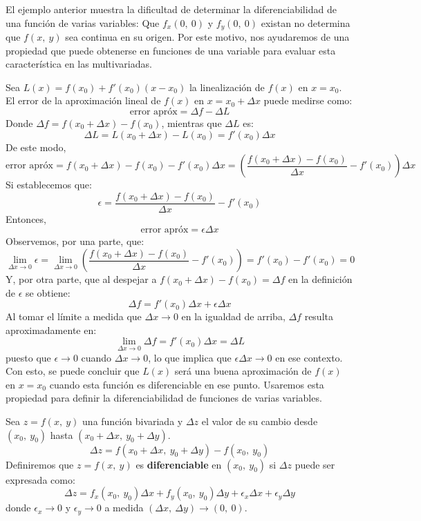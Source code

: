\documentclass[12pt]{article}
\begin{document}
El ejemplo anterior muestra la dificultad de determinar la diferenciabilidad de una función de varias variables: Que $f_{x}(0, \ 0)$ y $f_{y}(0, \ 0)$ existan no determina que $f(x, \ y)$ sea continua en su origen. Por este motivo, nos ayudaremos de una propiedad que puede obtenerse en funciones de una variable para evaluar esta característica en las multivariadas.

Sea $L(x) = f(x_{0}) + f'(x_{0})(x - x_{0})$ la linealización de $f(x)$ en $x = x_{0}$. El error de la aproximación lineal de $f(x)$ en $x = x_{0} + \Delta x$ puede medirse como:
\[
  \text{error apróx} = \Delta f - \Delta L
\]
Donde $\Delta f = f(x_{0} + \Delta x) - f(x_{0})$, mientras que $\Delta L$ es:
\[
  \Delta L = L(x_{0} + \Delta x) - L(x_{0})
           = f'(x_{0}) \Delta x
\]
De este modo,
\[
  \text{error apróx} = f(x_{0} + \Delta x) - f(x_{0}) - f'(x_{0}) \Delta x
                     = \left(\frac{f(x_{0} + \Delta x) - f(x_{0})}{\Delta x} - f'(x_{0})\right) \Delta x
\]
Si establecemos que:
\[
  \epsilon = \frac{f(x_{0} + \Delta x) - f(x_{0})}{\Delta x} - f'(x_{0})
\]
Entonces,
\[
  \text{error apróx} = \epsilon \Delta x
\]
Observemos, por una parte, que:
\[
  \lim_{\Delta x \to 0} \epsilon = \lim_{\Delta x \to 0} \left(\frac{f(x_{0} + \Delta x) - f(x_{0})}{\Delta x} - f'(x_{0})\right)
                                 = f'(x_{0}) - f'(x_{0})
                                 = 0
\]
Y, por otra parte, que al despejar a $f(x_{0} + \Delta x) - f(x_{0}) = \Delta f$ en la definición de $\epsilon$ se obtiene:
\[
  \Delta f = f'(x_{0}) \Delta x + \epsilon \Delta x
\]
Al tomar el límite a medida que $\Delta x \to 0$ en la igualdad de arriba, $\Delta f$ resulta aproximadamente en:
\[
  \lim_{\Delta x \to 0} \Delta f = f'(x_{0}) \Delta x = \Delta L
\]
puesto que $\epsilon \to 0$ cuando $\Delta x \to 0$, lo que implica que $\epsilon \Delta x \to 0$ en ese contexto. Con esto, se puede concluir que $L(x)$ será una buena aproximación de $f(x)$ en $x = x_{0}$ cuando esta función es diferenciable en ese punto. Usaremos esta propiedad para definir la diferenciabilidad de funciones de varias variables.

Sea $z = f(x, \ y)$ una función bivariada y $\Delta z$ el valor de su cambio desde $(x_{0}, \ y_{0})$ hasta $(x_{0} + \Delta x, \ y_{0} + \Delta y)$.
\[
  \Delta z = f(x_{0} + \Delta x, \ y_{0} + \Delta y) - f(x_{0}, \ y_{0})
\]
Definiremos que $z = f(x, \ y)$ es \textbf{diferenciable} en $(x_{0}, \ y_{0})$ si $\Delta z$ puede ser expresada como:
\[
  \Delta z = f_{x}(x_{0}, \ y_{0}) \Delta x + f_{y}(x_{0}, \ y_{0}) \Delta y + \epsilon_{x} \Delta x + \epsilon_{y} \Delta y
\]
donde $\epsilon_{x} \to 0$ y $\epsilon_{y} \to 0$ a medida $(\Delta x, \ \Delta y) \to (0, \ 0)$.
\end{document}
